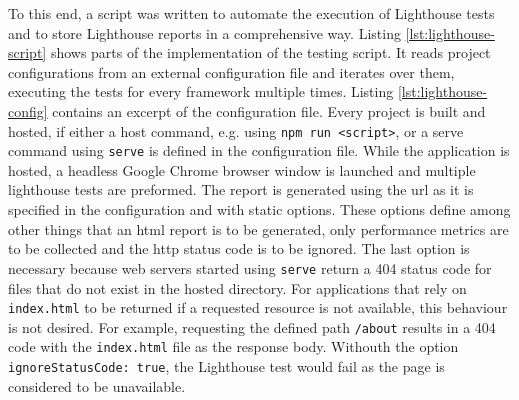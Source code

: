 \documentclass[a4paper, 12pt]{article}
\begin{document}
To this end, a script was written to automate the execution of Lighthouse tests and to store Lighthouse reports in a comprehensive way.
Listing \ref{lst:lighthouse-script} shows parts of the implementation of the testing script.
It reads project configurations from an external configuration file and iterates over them, executing the tests for every framework multiple times.
Listing \ref{lst:lighthouse-config} contains an excerpt of the configuration file.
Every project is built and hosted, if either a host command, e.g. using \verb|npm run <script>|, or a serve command using \verb|serve| is defined in the configuration file.
While the application is hosted, a headless Google Chrome browser window is launched and multiple lighthouse tests are preformed.
The report is generated using the \acrshort{url} as it is specified in the configuration and with static options.
These options define among other things that an \acrshort{html} report is to be generated, only performance metrics are to be collected and the \acrshort{http} status code is to be ignored.
The last option is necessary because web servers started using \verb|serve| return a 404 status code for files that do not exist in the hosted directory.
For applications that rely on \verb|index.html| to be returned if a requested resource is not available, this behaviour is not desired.
For example, requesting the defined path \verb|/about| results in a 404 code with the \verb|index.html| file as the response body.
Withouth the option \verb|ignoreStatusCode: true|, the Lighthouse test would fail as the page is considered to be unavailable.
\end{document}
